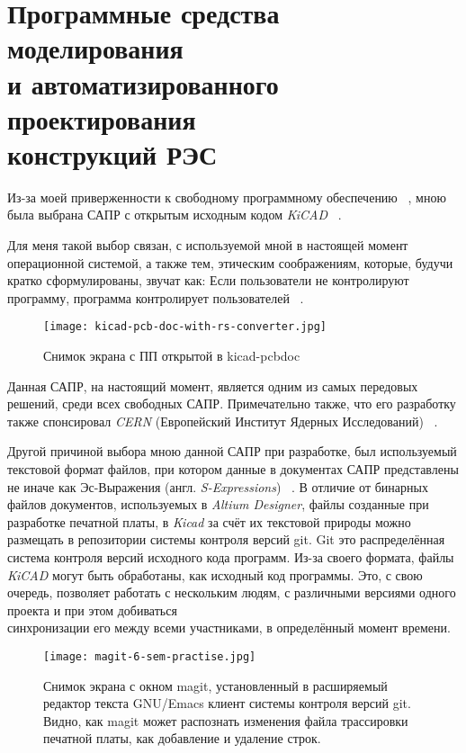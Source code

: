\section{Программные средства моделирования \\
  и автоматизированного проектирования \\
  конструкций РЭС}


Из-за моей приверженности к
свободному программному обеспечению ~\cite{GNU-philosophy},
мною была выбрана САПР
с открытым исходным кодом \textit{KiCAD} ~\cite{kicad-license}.


Для меня такой выбор связан,
с используемой мной в настоящей момент операционной системой,
а также тем, этическим соображениям, которые,
будучи кратко сформулированы,
звучат как: Если пользователи не контролируют программу,
программа контролирует пользователей ~\cite{ufair-nonfree-programs}.


\begin{figure}[H]
  \centering
  \texttt{[image: kicad-pcb-doc-with-rs-converter.jpg]}
  \caption{Снимок экрана с ПП открытой в kicad-pcbdoc}
\end{figure}


Данная САПР, на настоящий момент,
является одним из самых передовых решений,
среди всех свободных САПР.
Примечательно также, что его разработку также спонсировал \textit{CERN}
(Европейский Институт Ядерных Исследований) ~\cite{kicad-sponsors}.

Другой причиной выбора мною данной САПР при разработке,
был используемый текстовой формат файлов,
при котором данные в документах САПР представлены
не иначе как Эс-Выражения (англ. \textit{S-Expressions})
~\cite{kicad-sexpr}. В отличие от бинарных файлов документов,
используемых в \textit{Altium Designer},
файлы созданные при разработке печатной платы,
в \textit{Kicad} за счёт их текстовой природы
можно размещать в репозитории системы контроля версий git.
Git это распределённая система контроля версий \cite{git-dvcs}
исходного кода программ. Из-за своего формата,
файлы \textit{KiCAD} могут быть обработаны,
как исходный код программы. Это, с свою очередь,
позволяет работать с нескольким людям,
с различными версиями одного проекта
и при этом добиваться\\
синхронизации его между всеми участниками,
в определённый момент времени.

\begin{figure}[H]
  \centering
  \texttt{[image: magit-6-sem-practise.jpg]}
  \caption{Снимок экрана с окном magit,
    установленный в расширяемый редактор текста GNU/Emacs
    клиент системы контроля версий git.
    Видно, как magit может распознать изменения файла трассировки печатной платы,
    как добавление и удаление строк.}
\end{figure}


